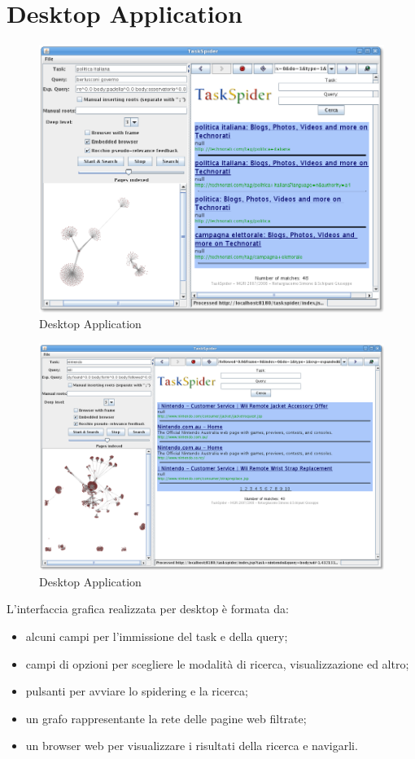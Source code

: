\section{Desktop Application}
\begin{figure}[htb]
\begin{center}
\includegraphics[scale=0.4]{etc/taskspider.png}
\caption{Desktop Application}
\label{desktopApp}
\end{center}
\end{figure}
\begin{figure}[htb]
\begin{center}
\includegraphics[scale=0.3]{etc/taskspider2.png}
\caption{Desktop Application}
\label{desktopApp2}
\end{center}
\end{figure}
L'interfaccia grafica realizzata per desktop è formata da:
\begin{itemize}
\item alcuni campi per l'immissione del task e della query;
\item campi di opzioni per scegliere le modalità di ricerca, visualizzazione ed altro;
\item pulsanti per avviare lo spidering e la ricerca;
\item un grafo rappresentante la rete delle pagine web filtrate;
\item un browser web per visualizzare i risultati della ricerca e navigarli.
\end{itemize}
